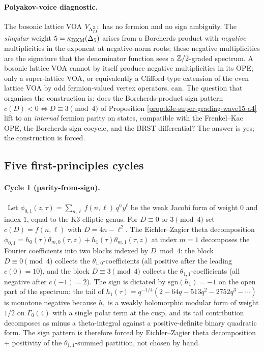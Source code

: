 \medskip

\paragraph{Polyakov-voice diagnostic.} The bosonic lattice VOA
$V_{\Lambda^{2,1}_{II}}$ has no fermion and no sign ambiguity. The
\emph{singular} weight $5 = \kappa_{\mathrm{BKM}}(\Delta_5)$ arises from a Borcherds
product with \emph{negative} multiplicities in the exponent at
negative-norm roots; these negative multiplicities are the
signature that the denominator function sees a $\mathbb{Z}/2$-graded
spectrum. A bosonic lattice VOA cannot by itself produce negative
multiplicities in its OPE; only a super-lattice VOA, or equivalently
a Clifford-type extension of the even lattice VOA by odd
fermion-valued vertex operators, can. The question that organises
the construction is: does the Borcherds-product sign pattern
$c(D) < 0 \iff D \equiv 3 \pmod{4}$ of Proposition
\ref{prop:k3e-super-grading-wave15-a4} lift to an \emph{internal}
fermion parity on states, compatible with the Frenkel--Kac OPE, the
Borcherds sign cocycle, and the BRST differential? The answer is
yes; the construction is forced.

\subsection{Five first-principles cycles}
\label{wn:ssec:wave15-a4-cycles}

\paragraph{Cycle 1 (parity-from-sign).}
\ClaimStatusProvedHere\
Let $\phi_{0,1}(z, \tau) = \sum_{n, \ell} f(n, \ell)\, q^n y^\ell$ be
the weak Jacobi form of weight $0$ and index $1$, equal to the K3
elliptic genus. For $D \equiv 0$ or $3 \pmod 4$ set
$c(D) = f(n, \ell)$ with $D = 4n - \ell^2$. The Eichler--Zagier
theta decomposition
$\phi_{0,1} = h_0(\tau) \theta_{m, 0}(\tau, z) +
h_1(\tau) \theta_{m, 1}(\tau, z)$
at index $m = 1$ decomposes the Fourier coefficients
into two blocks indexed by $D \bmod 4$: the block
$D \equiv 0 \pmod 4$ collects the $\theta_{1, 0}$-coefficients (all
positive after the leading $c(0) = 10$), and the block
$D \equiv 3 \pmod 4$ collects the $\theta_{1, 1}$-coefficients (all
negative after $c(-1) = 2$). The sign is dictated by
$\mathrm{sgn}(h_1) = -1$ on the open part of the spectrum: the
tail of $h_1(\tau) = q^{-1/4}(2 - 64 q - 513 q^2 - 2752 q^3 - \cdots)$
is monotone negative because $h_1$ is a weakly holomorphic modular
form of weight $1/2$ on $\Gamma_0(4)$ with a single polar term at the
cusp, and its tail contribution decomposes as minus a theta-integral
against a positive-definite binary quadratic form. The sign pattern
is therefore forced by Eichler--Zagier theta decomposition + positivity
of the $\theta_{1, 1}$-summed partition, not chosen by hand.

